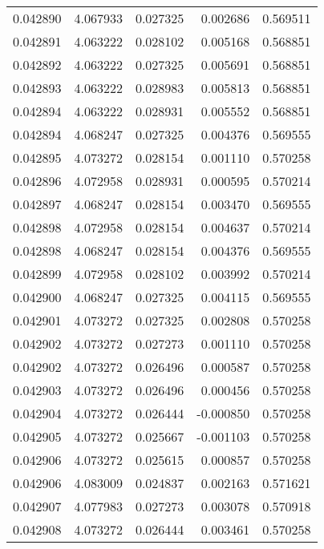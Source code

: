 \begin{tabular}{lrrrr}
0.042890    &  4.067933 &  0.027325 &  0.002686 &             0.569511 \\
0.042891    &  4.063222 &  0.028102 &  0.005168 &             0.568851 \\
0.042892    &  4.063222 &  0.027325 &  0.005691 &             0.568851 \\
0.042893    &  4.063222 &  0.028983 &  0.005813 &             0.568851 \\
0.042894    &  4.063222 &  0.028931 &  0.005552 &             0.568851 \\
0.042894    &  4.068247 &  0.027325 &  0.004376 &             0.569555 \\
0.042895    &  4.073272 &  0.028154 &  0.001110 &             0.570258 \\
0.042896    &  4.072958 &  0.028931 &  0.000595 &             0.570214 \\
0.042897    &  4.068247 &  0.028154 &  0.003470 &             0.569555 \\
0.042898    &  4.072958 &  0.028154 &  0.004637 &             0.570214 \\
0.042898    &  4.068247 &  0.028154 &  0.004376 &             0.569555 \\
0.042899    &  4.072958 &  0.028102 &  0.003992 &             0.570214 \\
0.042900    &  4.068247 &  0.027325 &  0.004115 &             0.569555 \\
0.042901    &  4.073272 &  0.027325 &  0.002808 &             0.570258 \\
0.042902    &  4.073272 &  0.027273 &  0.001110 &             0.570258 \\
0.042902    &  4.073272 &  0.026496 &  0.000587 &             0.570258 \\
0.042903    &  4.073272 &  0.026496 &  0.000456 &             0.570258 \\
0.042904    &  4.073272 &  0.026444 & -0.000850 &             0.570258 \\
0.042905    &  4.073272 &  0.025667 & -0.001103 &             0.570258 \\
0.042906    &  4.073272 &  0.025615 &  0.000857 &             0.570258 \\
0.042906    &  4.083009 &  0.024837 &  0.002163 &             0.571621 \\
0.042907    &  4.077983 &  0.027273 &  0.003078 &             0.570918 \\
0.042908    &  4.073272 &  0.026444 &  0.003461 &             0.570258 \\

\end{tabular}
